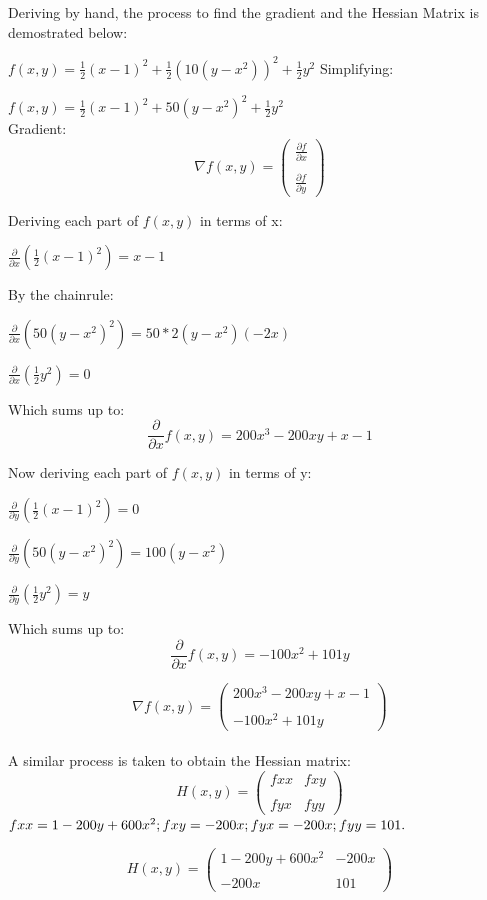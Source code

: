 Deriving by hand, the process to find the gradient and the Hessian Matrix is demostrated below: 

 $ f(x,y) = \frac{1}{2}(x-1)^2 +\frac{1}{2}(10(y-x^2))^2 + \frac{1}{2}y^2 $
\newline
Simplifying: 

 $ f(x,y) = \frac{1}{2}(x-1)^2 +50(y-x^2)^2 + \frac{1}{2}y^2 $
\newline
\\
Gradient:
\[
\nabla f(x,y) =
\begin{pmatrix}
\frac{\partial f}{\partial x}\\\\
\frac{\partial f}{\partial y}
\end{pmatrix}
\]

Deriving each part of $ f(x,y)$ in terms of x:
\newline

    $\frac{\partial}{\partial x}(\frac{1}{2}(x-1)^2) = x-1$
\newline

By the chainrule:

    $\frac{\partial}{\partial x}(50(y-x^2)^2) = 50*2(y-x^2)(-2x)$
\newline

    $\frac{\partial}{\partial x}(\frac{1}{2}y^2) = 0$
\newline

Which sums up to:
\[
{\frac{\partial}{\partial x}f(x,y) = 200x^3-200xy+x-1}
\]
\newline

Now deriving each part of $ f(x,y)$ in terms of y:
\newline

    $\frac{\partial}{\partial y}(\frac{1}{2}(x-1)^2) = 0$
\newline

    $\frac{\partial}{\partial y}(50(y-x^2)^2) = 100(y-x^2)$
\newline

    $\frac{\partial}{\partial y}(\frac{1}{2}y^2) = y$
\newline

Which sums up to:
\[
{\frac{\partial}{\partial x}f(x,y) = -100x^2+101y}
\]

\[
\nabla f(x,y) =
\begin{pmatrix}
200x^3-200xy+x-1\\\\
-100x^2+101y
\end{pmatrix}
\]
\newline
\\A similar process is taken to obtain the Hessian matrix:
\[
H(x,y) =
\begin{pmatrix}
fxx&fxy\\\\
fyx&fyy
\end{pmatrix}
\]
$fxx=1-200y+600x^2;\\fxy=-200x;\\fyx=-200x;\\  fyy=101.$

\[
H(x,y) =
\begin{pmatrix}
1-200y+600x^2&-200x\\\\
-200x&101
\end{pmatrix}
\]
